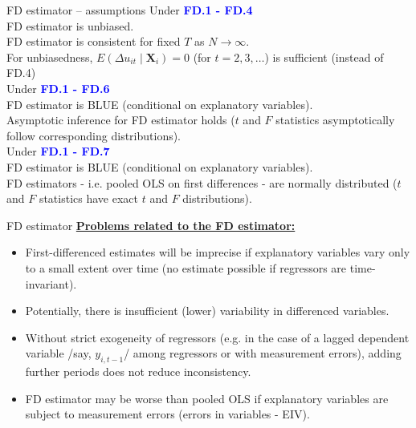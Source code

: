 \documentclass[usenames,dvipsnames]{beamer}
\begin{document}
\begin{frame}{FD estimator – assumptions}
Under  \textcolor{blue}{\textbf{FD.1 - FD.4}}\\
FD estimator is unbiased. \\
FD estimator is consistent for fixed $T$ as $N \rightarrow \infty$.\\
For unbiasedness, $E (\Delta u_{it} \mid \bm{X}_i) = 0$ (for $t = 2,3, \dots$) is sufficient (instead of FD.4)\\
\medskip
Under \textcolor{blue}{\textbf{FD.1 - FD.6}}\\
FD estimator is BLUE (conditional on explanatory variables).\\
Asymptotic inference for FD estimator holds ($t$ and $F$ statistics asymptotically follow corresponding distributions).\\
\medskip
Under  \textcolor{blue}{\textbf{FD.1 - FD.7}}\\
FD estimator is BLUE (conditional on explanatory variables).\\
FD estimators - i.e. pooled OLS on first differences - are normally distributed ($t$ and $F$ statistics have exact $t$ and $F$ distributions).
\end{frame}
\begin{frame}{FD estimator}
\underline{\textbf{Problems related to the FD estimator:}}\\ \medskip
\begin{itemize}
\item First-differenced estimates will be imprecise if explanatory variables vary only to a small extent over time (no estimate possible if regressors are time-invariant).
\item Potentially, there is insufficient (lower) variability in differenced variables.
\item Without strict exogeneity of regressors (e.g. in the case of a lagged dependent variable /say, $y_{i,t-1}$/ among regressors or with measurement errors), adding further periods does not reduce inconsistency.
\item FD estimator may be worse than pooled OLS if explanatory variables are subject to measurement errors (errors in variables - EIV).
\end{itemize}
\end{frame}
\end{document}
